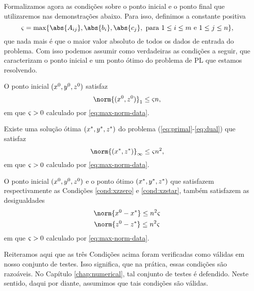 Formalizamos agora as condições sobre o ponto inicial e o ponto final que utilizaremos nas demonstrações abaixo. Para isso, definimos a constante positiva
\begin{equation}
	\label{eq:max-norm-data}
 	\bdxzstar = \max\{\abs{A_{ij}},\abs{b_{i}},\abs{c_{j}}, \text{ para } 1\leq i\leq m \text{ e } 1\leq j \leq n  \},
\end{equation}
que nada mais é que o maior valor absoluto de todos os dados de entrada do problema. 
Com isso podemos assumir como verdadeiras as  condições a seguir, que caracterizam o ponto inicial e um ponto ótimo do problema de PL que estamos resolvendo. 

\begin{cond} \label{cond:xzzero} O ponto inicial $(x^0 ,y^0,z^0 )$ satisfaz 
\begin{equation}
	\label{eq:norm-xz-zero}
	\norm{(\xzero,\zzero)}_{1} \leq \bdxzstar n,
\end{equation}
em que  $\varsigma>0$ calculado por \eqref{eq:max-norm-data}.
\end{cond}

\begin{cond} \label{cond:xzstar} Existe uma solução ótima $(x^*,y^*,z^*)$  do problema (\ref{eq:primal}-\ref{eq:dual}) que satisfaz 
\begin{equation}
	\label{eq:norm-xz-star}
	\norm{(\xstar,\zstar)}_{\infty} \leq \bdxzstar n^2,
\end{equation}
em que  $\varsigma>0$ calculado por \eqref{eq:max-norm-data}. 
\end{cond}



\begin{cond}\label{cond:x0-x*+z0-z*}  O ponto inicial $(x^0 ,y^0,z^0 )$ e o ponto ótimo $(x^*,y^*,z^*)$ que satisfazem respectivamente as Condições \ref{cond:xzzero} e \ref{cond:xzstar}, também satisfazem as desigualdades
\begin{subequations}\label{eq:x0-x*+z0-z*}
\begin{gather}
\norm{\xzero - \xstar} \leq n^2 \bdxzstar \label{eq:x0-x*} \\
\norm{\zzero - \zstar} \leq n^2\bdxzstar \label{eq:z0-z*}
\end{gather}
\end{subequations}
em que  $\varsigma>0$ calculado por \eqref{eq:max-norm-data}. 
\end{cond}


Reiteramos aqui que  as três Condições acima foram verificadas como válidas em nosso conjunto de testes. Isso significa, que na prática, essas condições são razoáveis. No Capítulo \ref{chap:numerical}, tal conjunto de testes é defendido. Neste sentido, daqui por diante, assumimos que tais condições são válidas. 

